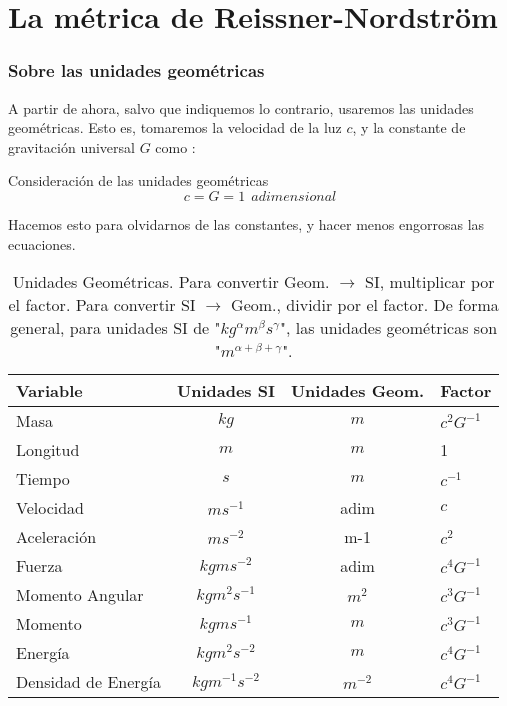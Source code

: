 \chapter{\textcolor{myred}{La métrica de Reissner-Nordström}}

\subsection*{\textbf{Sobre las unidades geométricas}}
A partir de ahora, salvo que indiquemos lo contrario, usaremos las unidades geométricas. Esto es, tomaremos la velocidad de la luz $c$, y la constante de gravitación universal $G$ como :

\begin{remarkbox}{Consideración de las unidades geométricas}
\begin{equation*}
    c=G=1\ \ \textit{adimensional}
\end{equation*}
\end{remarkbox}

Hacemos esto para olvidarnos de las constantes, y hacer menos engorrosas las ecuaciones.
\begin{table}[h]
  \begin{center}
    \begin{tabular}{lccl}
      \toprule
      Variable & Unidades SI & Unidades Geom. & Factor \\
      \midrule
      Masa & $kg$ & $m$ &$c^2 G^{-1}$ \\
      Longitud & $m$ & $m$ & 1 \\
      Tiempo & $s$ & $m$ & $c^{-1}$\\
      Velocidad & $m s^{-1}$ & adim & $c$  \\
      Aceleración & $m s^{-2}$ & m{-1} & $c^2$  \\
      Fuerza & $kg m s^{-2}$ & adim & $c^4 G^{-1}$  \\
      Momento Angular & $kg m^2 s^{-1}$ & $m^2$ & $c^3 G^{-1}$ \\
      Momento & $kg m s^{-1}$ & $m$ & $c^3 G^{-1}$ \\
      Energía & $kg m^2 s^{-2}$ & $m$ & $c^{4} G^{-1}$\\
      Densidad de Energía & $kg m^{-1} s^{-2}$ & $m^{-2}$ & $c^4 G^{-1}$  \\
      \bottomrule
    \end{tabular}
  \end{center}
  \caption{Unidades Geométricas. Para convertir Geom. $\rightarrow$ SI, multiplicar por el factor. Para convertir SI $\rightarrow$ Geom., dividir por el factor. De forma general, para unidades SI de "$kg^\alpha m^\beta s^\gamma$", las unidades geométricas son "$m^{\alpha + \beta + \gamma}$".}
  \label{geounits}
\end{table}
